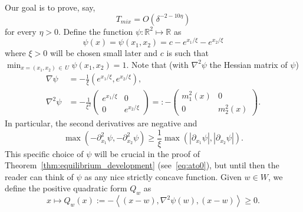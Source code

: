 \documentclass[AHL,Unicode,longabstracts,published]{cedram}
\newcommand{\R}{\mathbb{R}}
\begin{document}
Our goal is to prove, say,
\begin{equation}\label{Tmixub}
T_{mix}=O\left(\delta^{-2-10\eta}\right)
\end{equation}
for every $\eta>0$. Define the function $\psi:\R^2\mapsto \R$ as
\begin{equation}\label{eq:psi}
\psi(x)= \psi(x_1,x_2)=c-e^{ x_1/\xi}-e^{x_2/\xi}
\end{equation}
where $\xi>0$ will be chosen small later and $c$ is such that $\min_{x=(x_1,x_2)\,\in\,U}\psi(x_1,x_2)=1$. Note that (with $\nabla^2\psi$ the Hessian matrix of $\psi$)
\begin{equation}\label{eq:gradpsi}
\begin{split}
\nabla\psi &=-\frac1\xi\left(e^{x_1/\xi},e^{x_2/\xi}\right), \\ \nabla^2\psi &=-\frac1{\xi^2}
\left(
\begin{array}{ll}
e^{x_1/\xi}& 0\\
0 & e^{x_2/\xi}
\end{array}
\right)=:-\left(
\begin{array}{ll}
m^2_1(x)& 0\\
0 & m_2^2(x)
\end{array}
\right).
\end{split}
\end{equation}
In particular, the second derivatives are negative and
\begin{equation}\label{eq:confrontoderivate}
\max\left(-\partial^2_{x_1} \psi,-\partial^2_{x_2}\psi\right)\ge \frac1\xi \max\left(|\partial_{x_1}\psi|,|\partial_{x_2}\psi|\right).
\end{equation}
This specific choice of $\psi$ will be crucial in the proof of Theorem~\ref{thm:equilibrium_development} (see~\eqref{eq:ato0}), but until then the reader can think of $\psi$ as any nice strictly concave function. Given $w\in W$, we define the positive quadratic form $Q_w$ as
\begin{equation}\label{eq:quadform}
x\mapsto Q_w(x):=-\left\langle(x-w),\nabla^2\psi(w), (x-w)\right\rangle\ge 0.
\end{equation}
\end{document}

